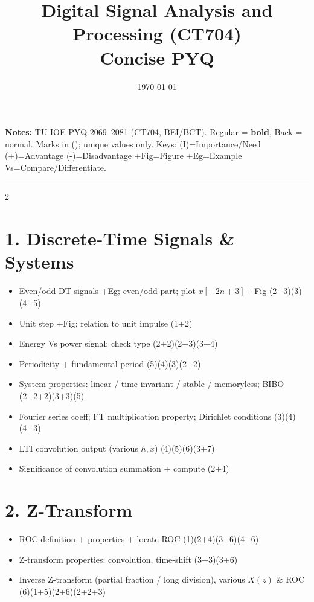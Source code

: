 \documentclass[10pt]{article}
\title{Digital Signal Analysis and Processing (CT704)\\[0.3em]\large Concise PYQ}
\author{}
\date{\today}
\begin{document}
\maketitle
\vspace{-1em}
\small
\textbf{Notes:} TU IOE PYQ 2069--2081 (CT704, BEI/BCT). Regular = \textbf{bold}, Back = normal.
Marks in (); unique values only.
Keys: (I)=Importance/Need \quad (+)=Advantage \quad (-)=Disadvantage \quad +Fig=Figure \quad +Eg=Example \quad Vs=Compare/Differentiate.
\vspace{2pt}
\hrule
\vspace{4pt}

\begin{multicols}{2}
\footnotesize

\section*{1. Discrete-Time Signals \& Systems}
\begin{itemize}
  \item Even/odd DT signals +Eg; even/odd part; plot $x[-2n+3]$ +Fig \hfill (2+3)(3)(4+5)
  \item Unit step +Fig; relation to unit impulse \hfill (1+2)
  \item Energy Vs power signal; check type \hfill (2+2)(2+3)(3+4)
  \item Periodicity + fundamental period \hfill (5)(4)(3)(2+2)
  \item System properties: linear / time-invariant / stable / memoryless; BIBO \hfill (2+2+2)(3+3)(5)
  \item Fourier series coeff; FT multiplication property; Dirichlet conditions \hfill (3)(4)(4+3)
  \item LTI convolution output (various $h,x$) \hfill (4)(5)(6)(3+7)
  \item Significance of convolution summation + compute \hfill (2+4)
\end{itemize}

\section*{2. Z-Transform}
\begin{itemize}
  \item ROC definition + properties + locate ROC \hfill (1)(2+4)(3+6)(4+6)
  \item Z-transform properties: convolution, time-shift \hfill (3+3)(3+6)
  \item Inverse Z-transform (partial fraction / long division), various $X(z)$ \& ROC \hfill (6)(1+5)(2+6)(2+2+3)
\end{itemize}


\end{multicols}
\end{document}
